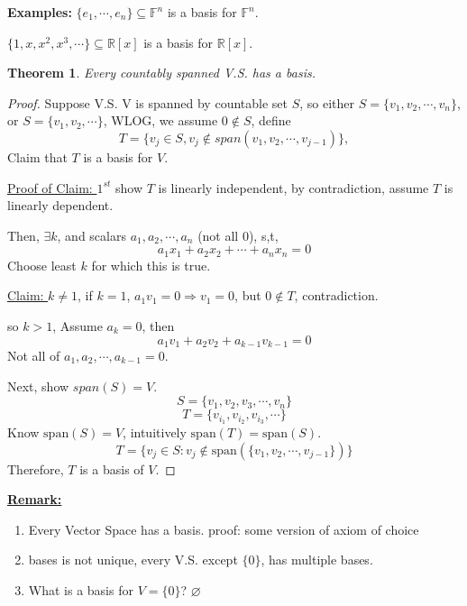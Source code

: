 \documentclass[12pt]{article}
\newtheorem{theorem}{Theorem}[subsection]
\newcommand{\Span}{\mathrm{span}}
\newcommand{\mR}{{\mathbb{R}}}
\newcommand{\mF}{{\mathbb{F}}}
\let\emptyset\varnothing
\begin{document}
	{\color{Brown}
		\textbf{Examples: }
		$\{e_1, \cdots, e_n\}\subseteq \mF^n$ is a basis for $\mF^n$. 

		$\{1,x,x^2,x^3,\cdots\} \subseteq \mR[x]$ is a basis for $\mR[x]$.\\ 
	}

	\begin{theorem}
		Every countably spanned V.S. has a basis.
	\end{theorem}
	\begin{proof}
		Suppose V.S. V is spanned by countable set $S$, so either 
		$ S = \{v_1, v_2, \cdots, v_n\}$, or $S = \{v_1, v_2, \cdots\}$, 
		WLOG, we assume $0\not\in S$, 
		define 
		\[
			T=\{v_j \in S, v_j \not \in span(v_1, v_2, \cdots, v_{j-1})\},
		\]
		Claim that $T$ is a basis for $V$. 

		
		\underline{Proof of Claim: }
		$1^{st}$ show $T$ is linearly independent, 
		by contradiction, assume $T$ is linearly dependent. 
		
		Then, $\exists k$, and scalars $a_1, a_2, \cdots, a_n$ (not all $0$),
		s,t, 
		\[
			a_1x_1+a_2x_2+\cdots+a_nx_n = 0
		\]
		Choose least $k$ for which this is true. 

		\underline{Claim: } $k\neq 1$, if $k=1$, $a_1v_1=0 \Rightarrow v_1=0$, 
		but $0 \not \in T$, contradiction. 
		
		so $k>1$, Assume $a_k=0$, then 
		\[
			a_1v_1+a_2v_2+a_{k-1}v_{k-1} = 0
		\]
		Not all of $a_1,a_2,\cdots,a_{k-1} = 0$. 

		Next, show $span (S) = V$. 
		\[
			S = \{v_1, v_2, v_3, \cdots, v_n\}
		\]
		\[
			T = \{v_{i_1}, v_{i_2}, v_{i_3}, \cdots\} 
		\]
		Know $\Span (S) = V$,  intuitively $\Span(T) = \Span(S)$. 
		\[
			T = \{v_j \in S: v_j \not \in \Span(\{v_1, v_2, \cdots, v_{j-1}\})\}
		\]
		Therefore, $T$ is a basis of $V$. 


	\end{proof}

	{\color{Maroon}
	
	\underline{\textbf{Remark: }} 
	\begin{enumerate}
		\item Every Vector Space has a basis. 
			proof: some version of axiom of choice
		\item bases is not unique, every V.S. except $\{0\}$, has multiple 
			bases. 
		\item What is a basis for $V = \{0\}$? $\emptyset$\\
	\end{enumerate}
	}
	
\end{document}
